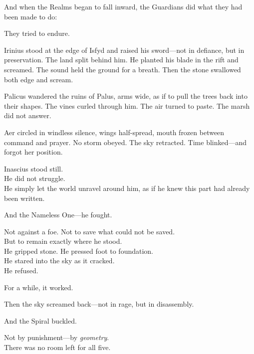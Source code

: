 \documentclass[12pt]{article}
\begin{document}
\vspace{0.5em}
And when the Realms began to fall inward, the Guardians did what they had been made to do:

\vspace{0.5em}
They tried to endure.

\vspace{0.5em}
Irinius stood at the edge of Isfyd and raised his sword---not in defiance, but in preservation. The land split behind him. He planted his blade in the rift and screamed. The sound held the ground for a breath. Then the stone swallowed both edge and scream.

\vspace{0.5em}
Palicus wandered the ruins of Palus, arms wide, as if to pull the trees back into their shapes. The vines curled through him. The air turned to paste. The marsh did not answer.

\vspace{0.5em}
Aer circled in windless silence, wings half-spread, mouth frozen between command and prayer. No storm obeyed. The sky retracted. Time blinked---and forgot her position.

\vspace{0.5em}
Inascius stood still.\\
He did not struggle.\\
He simply let the world unravel around him, as if he knew this part had already been written.

\vspace{0.5em}
And the Nameless One---he fought.

\vspace{0.5em}
Not against a foe. Not to save what could not be saved.\\
But to remain exactly where he stood.\\
He gripped stone. He pressed foot to foundation.\\
He stared into the sky as it cracked.\\
He refused.

\vspace{0.5em}
For a while, it worked.

\vspace{0.5em}
Then the sky screamed back---not in rage, but in disassembly.

\vspace{0.5em}
And the Spiral buckled.

\vspace{0.5em}
Not by punishment---by \textit{geometry}.\\
There was no room left for all five.
\end{document}
